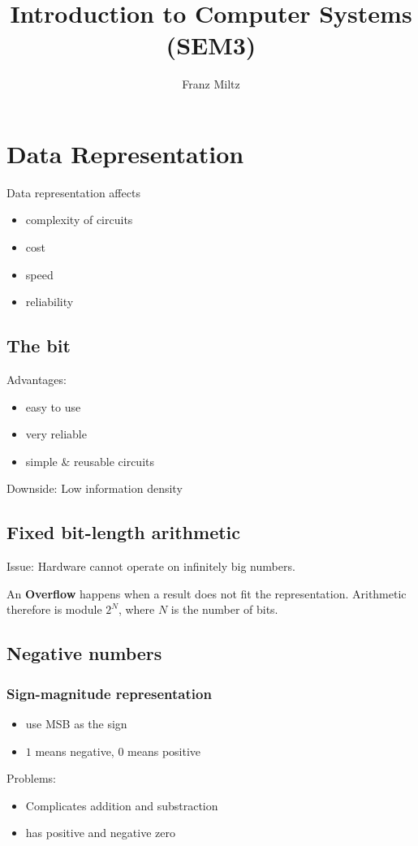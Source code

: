 \documentclass{article}
\begin{document}
\title{Introduction to Computer Systems (SEM3)}
\author{Franz Miltz}
\maketitle
\tableofcontents
\pagebreak
\section{Data Representation}
Data representation affects
\begin{itemize}
	\item complexity of circuits
	\item cost
	\item speed 
	\item reliability
\end{itemize}
\subsection{The bit}
Advantages:
\begin{itemize}
	\item easy to use
	\item very reliable
	\item simple \& reusable circuits
\end{itemize}
Downside: Low information density
\subsection{Fixed bit-length arithmetic}
Issue: Hardware cannot operate on infinitely big numbers.
\begin{definition}
	An \textbf{Overflow} happens when a result does not fit the representation.
	Arithmetic therefore is module $2^N$, where $N$ is the number of bits.
\end{definition}
\subsection{Negative numbers}
\subsubsection{Sign-magnitude representation}
\begin{itemize}
	\item use MSB as the sign
	\item $1$ means negative, $0$ means positive
\end{itemize}
Problems: \begin{itemize}
	\item Complicates addition and substraction
	\item has positive and negative zero
\end{itemize}
\end{document}
